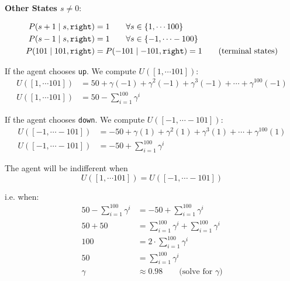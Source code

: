 \textbf{Other States $s\neq 0$}:

\begin{align*}
P(s+1 \mid s, \texttt{right}) &= 1 \qquad \forall s \in \left\{1, \cdots 100\right\} \\ 
P(s-1 \mid s, \texttt{right}) &= 1 \qquad \forall s \in \left\{-1, \cdots -100\right\} \\
P(101 \mid 101, \texttt{right}) &= P(-101 \mid -101, \texttt{right}) = 1 \qquad \text{(terminal states)} \\ 
\end{align*}



If the agent chooses \texttt{up}. We compute $U([1, \cdots 101])$:
\begin{align*}
U([1, \cdots 101]) &= 50 + \gamma (-1) + \gamma^2 (-1) + \gamma^3 (-1) + \cdots + \gamma^{100} (-1) \\
U([1, \cdots 101]) &= 50 - \sum_{i=1}^{100} \gamma^i
\end{align*}

If the agent chooses \texttt{down}. We compute $U([-1, \cdots -101])$:
\begin{align*}
U([-1, \cdots -101]) &= -50 + \gamma (1) + \gamma^2 (1) + \gamma^3 (1) + \cdots + \gamma^{100} (1) \\
U([-1, \cdots -101]) &= -50 + \sum_{i=1}^{100} \gamma^i
\end{align*}


The agent will be indifferent when
\[
U([1, \cdots 101]) = U([-1, \cdots -101])
\]

i.e. when:
\begin{align*}
50 - \sum_{i=1}^{100} \gamma^i &= -50 + \sum_{i=1}^{100} \gamma^i \\
50 + 50 &=  \sum_{i=1}^{100} \gamma^i + \sum_{i=1}^{100} \gamma^i \\
100 &=  2 \cdot \sum_{i=1}^{100} \gamma^i \\
50 &= \sum_{i=1}^{100} \gamma^i \\ 
\gamma &\approx 0.98 \qquad \text{(solve for $\gamma$)}
\end{align*}

